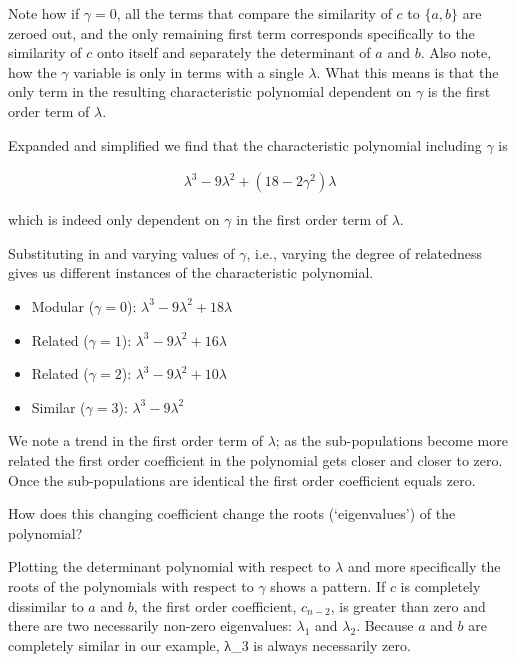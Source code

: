 \documentclass[
  letterpaper,
  DIV=11,
  numbers=noendperiod]{scrartcl}
\providecommand{\tightlist}{%
  \setlength{\itemsep}{0pt}\setlength{\parskip}{0pt}}\usepackage{longtable,booktabs,array}
\begin{document}
Note how if \(\gamma=0\), all the terms that compare the similarity of
\(c\) to \(\{a, b\}\) are zeroed out, and the only remaining first term
corresponds specifically to the similarity of \(c\) onto itself and
separately the determinant of \(a\) and \(b\). Also note, how the
\(\gamma\) variable is only in terms with a single \(\lambda\). What
this means is that the only term in the resulting characteristic
polynomial dependent on \(\gamma\) is the first order term of
\(\lambda\).

Expanded and simplified we find that the characteristic polynomial
including \(\gamma\) is

\begin{align*}
\lambda^3 - 9\lambda^2 + (18 - 2\gamma^2)\lambda
\end{align*}

which is indeed only dependent on \(\gamma\) in the first order term of
\(\lambda\).

Substituting in and varying values of \(\gamma\), i.e., varying the
degree of relatedness gives us different instances of the characteristic
polynomial.

\begin{itemize}
\tightlist
\item
  Modular (\(\gamma = 0\)): \(\lambda^3 - 9\lambda^2 + 18\lambda\)
\item
  Related (\(\gamma = 1\)): \(\lambda^3 - 9\lambda^2 + 16\lambda\)
\item
  Related (\(\gamma = 2\)): \(\lambda^3 - 9\lambda^2 + 10\lambda\)
\item
  Similar (\(\gamma = 3\)): \(\lambda^3 - 9\lambda^2\)
\end{itemize}

We note a trend in the first order term of \(\lambda\); as the
sub-populations become more related the first order coefficient in the
polynomial gets closer and closer to zero. Once the sub-populations are
identical the first order coefficient equals zero.

How does this changing coefficient change the roots (`eigenvalues') of
the polynomial?

Plotting the determinant polynomial with respect to \(\lambda\) and more
specifically the roots of the polynomials with respect to \(\gamma\)
shows a pattern. If \(c\) is completely dissimilar to \(a\) and \(b\),
the first order coefficient, \(c_{n-2}\), is greater than zero and there
are two necessarily non-zero eigenvalues: \(λ_1\) and \(λ_2\). Because
\(a\) and \(b\) are completely similar in our example, λ\_3 is always
necessarily zero.
\end{document}
